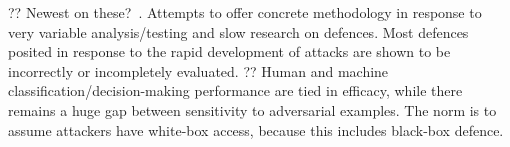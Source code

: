 ?? Newest on these?~\parencite{DBLP:journals/corr/abs-1902-06705}. Attempts to offer concrete methodology in response to very variable analysis/testing and slow research on defences. Most defences posited in response to the rapid development of attacks are shown to be incorrectly or incompletely evaluated. ?? Human and machine classification/decision-making performance are tied in efficacy, while there remains a huge gap between sensitivity to adversarial examples. The norm is to assume attackers have white-box access, because this includes black-box defence.